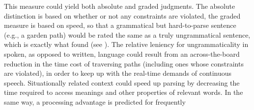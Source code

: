 This measure could yield both absolute and graded judgments. The absolute distinction is based on whether or not any constraints are violated, the graded measure is based on speed, so that a grammatical but hard-to-parse sentence (e.g., a garden path) would be rated the same as a truly ungrammatical sentence, which is exactly what \citet{WarnerEtAl1987} found (see ). The relative leniency for ungrammaticality in spoken, as opposed to written, language could result from an across-the-board reduction in the time cost of traversing paths (including ones whose constraints are violated), in order to keep up with the real-time demands of continuous speech. Situationally related context could speed up parsing by decreasing the time required to access meanings and other properties of relevant words. In the same way, a processing advantage is predicted for frequently
